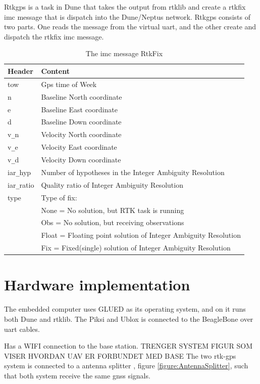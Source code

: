 Rtkgps is a task in Dune that takes the output from rtklib and create a rtkfix imc message that is dispatch into the Dune/Neptus network. Rtkgps consists of two parts. One reads the message from the virtual uart, and the other create and dispatch the rtkfix imc message.
\begin{table}[!h]
\begin{center}
    \begin{tabular}{ | l | l |}
    \hline
    \textbf{Header} & \textbf{Content} \\ \hline
     tow & Gps time of Week  \\ \hline
     n & Baseline North coordinate \\ \hline
     e & Baseline East coordinate \\ \hline
     d & Baseline Down coordinate \\ \hline
     v\verb=_=n & Velocity North coordinate \\ \hline
     v\verb=_=e & Velocity East coordinate \\ \hline
     v\verb=_=d & Velocity Down coordinate \\ \hline
     iar\verb=_=hyp & Number of hypotheses in the Integer Ambiguity Resolution \\ \hline
     iar\verb=_=ratio & Quality ratio of Integer Ambiguity Resolution \\ \hline
     type & Type of fix: \\& None = No solution, but RTK task is running
     \\& Obs = No solution, but receiving observations
     \\& Float = Floating point solution of Integer Ambiguity Resolution
     \\& Fix = Fixed(single) solution of Integer Ambiguity Resolution \\ \hline
    \end{tabular}
\end{center}
\caption{The \gls{imc} message RtkFix }
\label{Tb:RtkFix}
\end{table}

\section{Hardware implementation}
The embedded computer uses GLUED as its operating system, and on it runs both Dune and rtklib. The Piksi and Ublox is connected to the BeagleBone over uart cables.

Has a WIFI connection to the base station.
TRENGER SYSTEM FIGUR SOM VISER HVORDAN UAV ER FORBUNDET MED BASE
The two \gls{rtk-gps} system is connected to a antenna splitter , figure \ref{figure:AntennaSplitter}, such that both system receive the same \gls{gnss} signals.

